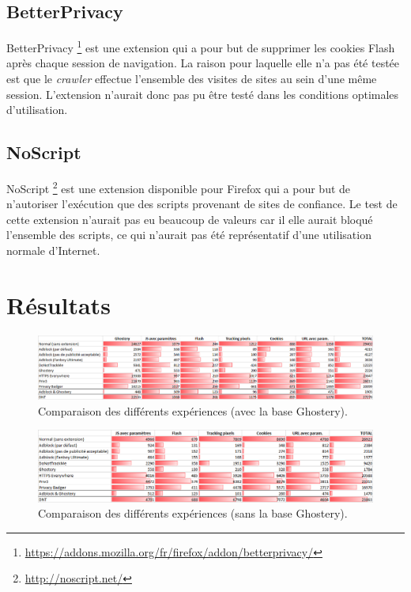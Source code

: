 \subsection{BetterPrivacy}
BetterPrivacy \footnote{\url{https://addons.mozilla.org/fr/firefox/addon/betterprivacy/}} est une extension qui a pour but de supprimer les cookies Flash après chaque session de navigation. La raison pour laquelle elle n'a pas été testée est que le \textit{crawler} effectue l'ensemble des visites de sites au sein d'une même session. L'extension n'aurait donc pas pu être testé dans les conditions optimales d'utilisation.

\subsection{NoScript}
NoScript \footnote{\url{http://noscript.net/}} est une extension disponible pour Firefox qui a pour but de n'autoriser l'exécution que des scripts provenant de sites de confiance. Le test de cette extension n'aurait pas eu beaucoup de valeurs car il elle aurait bloqué l'ensemble des scripts, ce qui n'aurait pas été représentatif d'une utilisation normale d'Internet.

\section{Résultats}
\label{results_plugins}

\begin{figure}[!h]
	\hspace{-2cm}
	\includegraphics[scale=.54]{resultats/ANALYSES/Images/Comparaisons-Ghostery.png}
	\caption{\label{exp-DNT-ghostery}Comparaison des différents expériences (avec la base Ghostery).}
\end{figure}

\begin{figure}[!h]
	\hspace{-2cm}
	\includegraphics[scale=.6]{resultats/ANALYSES/Images/Comparaisons-NoG.png}
	\caption{\label{exp-DNT-ghostery}Comparaison des différents expériences (sans la base Ghostery).}
\end{figure}

